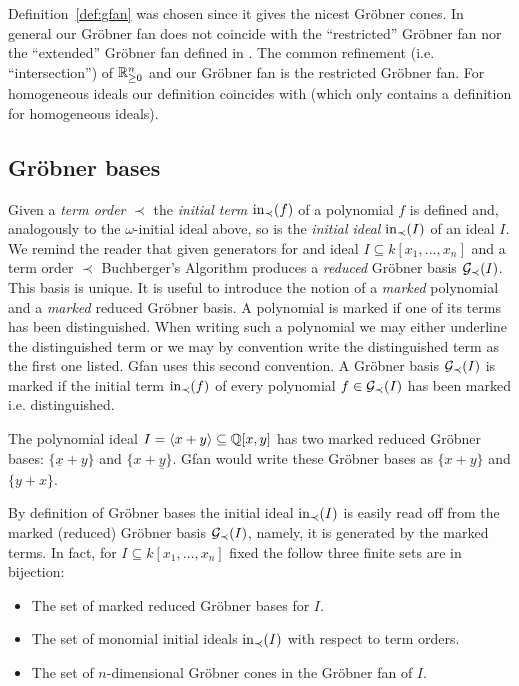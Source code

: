 \begin{remark}
Definition~\ref{def:gfan} was chosen since it gives the nicest
Gr\"obner cones. In general our Gr\"obner fan does not coincide with
the ``restricted'' Gr\"obner fan nor the ``extended'' Gr\"obner fan
defined in \cite{MoRo}. The common refinement (i.e. ``intersection'')
of $\mathbb{R}_{\geq 0}^n$ and our Gr\"obner fan is the restricted Gr\"obner
fan. For homogeneous ideals our definition coincides with
\cite[page~13]{sturmfels} (which only contains a definition for homogeneous
ideals).
\end{remark}

\subsection{Gr\"obner bases}
Given a \emph{term order} $\prec$ the \emph{initial term} $\textup{in}_\prec(f)$ of a
polynomial $f$ is defined and, analogously to the $\omega$-initial
ideal above, so is the \emph{initial ideal} $\textup{in}_\prec(I)$ of an ideal $I$.
We remind the reader that given generators for and ideal $I\subseteq
k[x_1,\dots,x_n]$ and a term order $\prec$ Buchberger's
Algorithm produces a \emph{reduced} Gr\"obner basis
$\mathcal{G}_\prec(I)$. This basis is unique. It is useful to introduce the
notion of a \emph{marked} polynomial and a \emph{marked} reduced
Gr\"obner basis. A polynomial is marked if one of its terms has been
distinguished. When writing such a polynomial we may either underline
the distinguished term or we may by convention write the distinguished
term as the first one listed. Gfan uses this second convention. A
Gr\"obner basis $\mathcal{G}_\prec(I)$ is marked if the initial term
$\textup{in}_\prec(f)$ of every polynomial $f\in\mathcal{G}_\prec(I)$ has been marked
i.e. distinguished.
\begin{example}
The polynomial ideal $I=\langle x+y\rangle\subseteq \mathbb{Q}[x,y]$ has two
marked reduced Gr\"obner bases: $\{\underline{x}+y\}$ and
$\{x+\underline{y}\}$. Gfan would write these Gr\"obner bases as
$\{x+y\}$ and $\{y+x\}$.
\end{example}
By definition of Gr\"obner bases the initial ideal
$\textup{in}_\prec(I)$ is easily read off from the marked (reduced)
Gr\"obner basis $\mathcal{G}_\prec(I)$, namely, it is generated by the marked
terms. In fact, for $I\subseteq k[x_1,\dots,x_n]$ fixed the follow
three finite sets are in bijection:
\begin{itemize}
\item The set of marked reduced Gr\"obner bases for $I$.
\item The set of monomial initial ideals $\textup{in}_\prec(I)$ with respect to term orders.
\item The set of $n$-dimensional Gr\"obner cones in the Gr\"obner fan of $I$.
\end{itemize}
